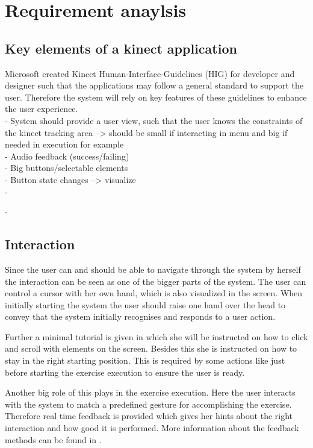 \section{Requirement anaylsis}\label{4_1_requirements}
\subsection{Key elements of a kinect application}
Microsoft created Kinect Human-Interface-Guidelines (HIG) for developer and designer such that the applications may follow a general standard to support the user. Therefore the system will rely on key features of these guidelines to enhance the user experience.
\\- System should provide a user view, such that the user knows the constraints of the kinect tracking area --> should be small if interacting in menu and big if needed in execution for example
\\- Audio feedback (success/failing)
\\- Big buttons/selectable elements
\\- Button state changes --> visualize
\\- 

- 

\subsection{Interaction}\label{4_2_interaction}
Since the user can and should be able to navigate through the system by herself the interaction can be seen as one of the bigger parts of the system. The user can control a cursor with her own hand, which is also visualized in the screen. When initially starting the system the user should raise one hand over the head to convey that the system initially recognises and responds to a user action. 

Further a minimal tutorial is given in which she will be instructed on how to click and scroll with elements on the screen. Besides this she is instructed on how to stay in the right starting position. This is required by some actions like just before starting the exercise execution to ensure the user is ready.

Another big role of this plays in the exercise execution. Here the user interacts with the system to match a predefined gesture for accomplishing the exercise. Therefore real time feedback is provided which gives her hints about the right interaction and how good it is performed. More information about the feedback methods can be found in \textbf{}.

